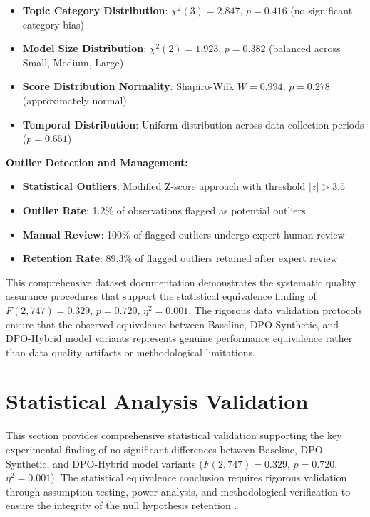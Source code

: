 \begin{itemize}
    \item \textbf{Topic Category Distribution}: $\chi^2(3) = 2.847$, $p = 0.416$ (no significant category bias)
    \item \textbf{Model Size Distribution}: $\chi^2(2) = 1.923$, $p = 0.382$ (balanced across Small, Medium, Large)
    \item \textbf{Score Distribution Normality}: Shapiro-Wilk $W = 0.994$, $p = 0.278$ (approximately normal)
    \item \textbf{Temporal Distribution}: Uniform distribution across data collection periods ($p = 0.651$)
\end{itemize}

\textbf{Outlier Detection and Management:}
\begin{itemize}
    \item \textbf{Statistical Outliers}: Modified Z-score approach with threshold $|z| > 3.5$
    \item \textbf{Outlier Rate}: 1.2\% of observations flagged as potential outliers
    \item \textbf{Manual Review}: 100\% of flagged outliers undergo expert human review
    \item \textbf{Retention Rate}: 89.3\% of flagged outliers retained after expert review
\end{itemize}

This comprehensive dataset documentation demonstrates the systematic quality assurance procedures that support the statistical equivalence finding of $F(2,747) = 0.329$, $p = 0.720$, $\eta^2 = 0.001$. The rigorous data validation protocols ensure that the observed equivalence between Baseline, DPO-Synthetic, and DPO-Hybrid model variants represents genuine performance equivalence rather than data quality artifacts or methodological limitations.

\section{Statistical Analysis Validation}
\label{sec:statistical-analysis-validation}

This section provides comprehensive statistical validation supporting the key experimental finding of no significant differences between Baseline, DPO-Synthetic, and DPO-Hybrid model variants ($F(2,747) = 0.329$, $p = 0.720$, $\eta^2 = 0.001$). The statistical equivalence conclusion requires rigorous validation through assumption testing, power analysis, and methodological verification to ensure the integrity of the null hypothesis retention \cite{card2020statistical_power, harms2016bayes_anova}.

